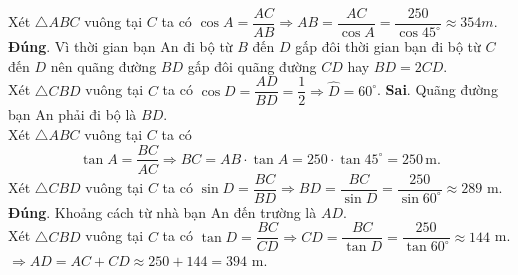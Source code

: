 \begin{ex}
{\begin{itemchoice}
	Xét $\triangle ABC$ vuông tại $C$ ta có $\cos A = \dfrac{AC}{AB} \Rightarrow AB = \dfrac{AC}{\cos A} = \dfrac{250}{\cos 45^\circ} \approx 354m$. 
	\itemch \textbf{Đúng}. Vì thời gian bạn An đi bộ từ $B$ đến $D$ gấp đôi thời gian bạn đi bộ từ $C$ đến $D$ nên quãng đường $BD$ gấp đôi quãng đường $CD$ hay $BD = 2CD$.\\
	Xét $\triangle CBD$ vuông tại $C$ ta có $\cos D = \dfrac{AD}{BD} = \dfrac{1}{2} \Rightarrow \widehat{D} = 60^\circ$. 
	\itemch \textbf{Sai}. Quãng đường bạn An phải đi bộ là $BD$.\\
	Xét $\triangle ABC$ vuông tại $C$ ta có 
	$$\tan A = \dfrac{BC}{AC} \Rightarrow BC = AB \cdot \tan A = 250 \cdot \tan 45^\circ = 250\,\mathrm{m}.$$
	Xét $\triangle CBD$ vuông tại $C$ ta có $\sin D = \dfrac{BC}{BD} \Rightarrow BD = \dfrac{BC}{\sin D} = \dfrac{250}{\sin 60^\circ} \approx 289$ m. 
	\itemch \textbf{Đúng}. Khoảng cách từ nhà bạn An đến trường là $AD$.\\
	Xét $\triangle CBD$ vuông tại $C$ ta có $\tan D = \dfrac{BC}{CD} \Rightarrow CD = \dfrac{BC}{\tan D} = \dfrac{250}{\tan 60^\circ} \approx 144$ m.\\
	$\Rightarrow AD = AC + CD \approx 250 + 144 = 394$ m.
	\end{itemchoice}
	}
\end{ex}
